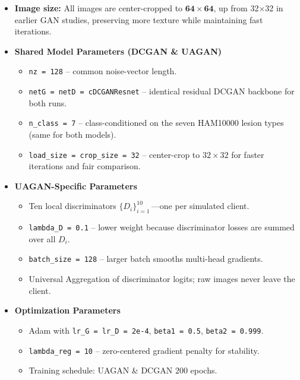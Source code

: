 \documentclass{article}
\begin{document}
\begin{itemize}
\item \textbf{Image size:} All images are center-cropped to \(\mathbf{64\times64}\), up from 32×32 in earlier GAN studies, preserving more texture while maintaining fast iterations.

\item \textbf{Shared Model Parameters (DCGAN \& UAGAN)}
  \begin{itemize}
    \item \texttt{nz = 128} – common noise-vector length. 
    \item \texttt{netG = netD = cDCGANResnet} – identical residual DCGAN backbone for both runs. 
    \item \texttt{n\_class = 7} – class-conditioned on the seven HAM10000 lesion types (same for both models). 
    \item \texttt{load\_size = crop\_size = 32} – center-crop to \(32\times32\) for faster iterations and fair comparison.
  \end{itemize}

\item \textbf{UAGAN-Specific Parameters}
  \begin{itemize}
    \item Ten local discriminators \(\{D_i\}_{i=1}^{10}\)\,—one per simulated client. 
    \item \texttt{lambda\_D = 0.1} – lower weight because discriminator losses are summed over all \(D_i\). 
    \item \texttt{batch\_size = 128} – larger batch smooths multi-head gradients. 
    \item Universal Aggregation of discriminator logits; raw images never leave the client.
  \end{itemize}

\item \textbf{Optimization Parameters}
  \begin{itemize}
    \item Adam with \texttt{lr\_G = lr\_D = 2e-4}, \texttt{beta1 = 0.5}, \texttt{beta2 = 0.999}. 
    \item \texttt{lambda\_reg = 10} – zero-centered gradient penalty for stability. 
    \item Training schedule: UAGAN \& DCGAN \(200\) epochs.
  \end{itemize}


\end{itemize}
\end{document}
